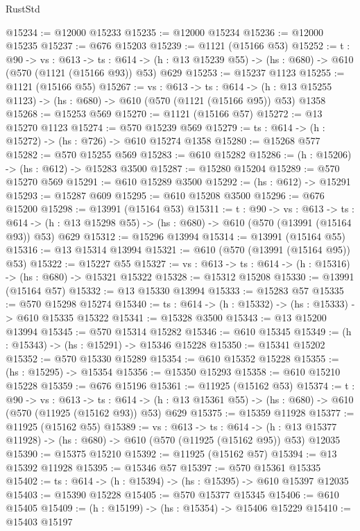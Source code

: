 \begin{lexlean}{RustStd}
\begin{coremodule}
@15234 := @12000 @15233
@15235 := @12000 @15234
@15236 := @12000 @15235
@15237 := @676 @15203
@15239 := @1121 (@15166 @53)
@15252 := {t : @90} ->
  {vs : @613} ->
  {ts : @614} -> (h : @13 @15239 @55) -> (hs : @680) -> @610 (@570 (@1121 (@15166 @93)) @53) @629
@15253 := @15237 @1123
@15255 := @1121 (@15166 @55)
@15267 := {vs : @613} ->
  {ts : @614} -> (h : @13 @15255 @1123) -> (hs : @680) -> @610 (@570 (@1121 (@15166 @95)) @53) @1358
@15268 := @15253 @569
@15270 := @1121 (@15166 @57)
@15272 := @13 @15270 @1123
@15274 := @570 @15239 @569
@15279 := {ts : @614} -> (h : @15272) -> (hs : @726) -> @610 @15274 @1358
@15280 := @15268 @577
@15282 := @570 @15255 @569
@15283 := @610 @15282
@15286 := (h : @15206) -> (hs : @612) -> @15283 @3500
@15287 := @15280 @15204
@15289 := @570 @15270 @569
@15291 := @610 @15289 @3500
@15292 := (hs : @612) -> @15291
@15293 := @15287 @609
@15295 := @610 @15208 @3500
@15296 := @676 @15200
@15298 := @13991 (@15164 @53)
@15311 := {t : @90} ->
  {vs : @613} ->
  {ts : @614} -> (h : @13 @15298 @55) -> (hs : @680) -> @610 (@570 (@13991 (@15164 @93)) @53) @629
@15312 := @15296 @13994
@15314 := @13991 (@15164 @55)
@15316 := @13 @15314 @13994
@15321 := @610 (@570 (@13991 (@15164 @95)) @53)
@15322 := @15227 @55
@15327 := {vs : @613} -> {ts : @614} -> (h : @15316) -> (hs : @680) -> @15321 @15322
@15328 := @15312 @15208
@15330 := @13991 (@15164 @57)
@15332 := @13 @15330 @13994
@15333 := @15283 @57
@15335 := @570 @15298 @15274
@15340 := {ts : @614} -> (h : @15332) -> (hs : @15333) -> @610 @15335 @15322
@15341 := @15328 @3500
@15343 := @13 @15200 @13994
@15345 := @570 @15314 @15282
@15346 := @610 @15345
@15349 := (h : @15343) -> (hs : @15291) -> @15346 @15228
@15350 := @15341 @15202
@15352 := @570 @15330 @15289
@15354 := @610 @15352 @15228
@15355 := (hs : @15295) -> @15354
@15356 := @15350 @15293
@15358 := @610 @15210 @15228
@15359 := @676 @15196
@15361 := @11925 (@15162 @53)
@15374 := {t : @90} ->
  {vs : @613} ->
  {ts : @614} -> (h : @13 @15361 @55) -> (hs : @680) -> @610 (@570 (@11925 (@15162 @93)) @53) @629
@15375 := @15359 @11928
@15377 := @11925 (@15162 @55)
@15389 := {vs : @613} ->
  {ts : @614} ->
  (h : @13 @15377 @11928) -> (hs : @680) -> @610 (@570 (@11925 (@15162 @95)) @53) @12035
@15390 := @15375 @15210
@15392 := @11925 (@15162 @57)
@15394 := @13 @15392 @11928
@15395 := @15346 @57
@15397 := @570 @15361 @15335
@15402 := {ts : @614} -> (h : @15394) -> (hs : @15395) -> @610 @15397 @12035
@15403 := @15390 @15228
@15405 := @570 @15377 @15345
@15406 := @610 @15405
@15409 := (h : @15199) -> (hs : @15354) -> @15406 @15229
@15410 := @15403 @15197

\end{coremodule}
\end{lexlean}
